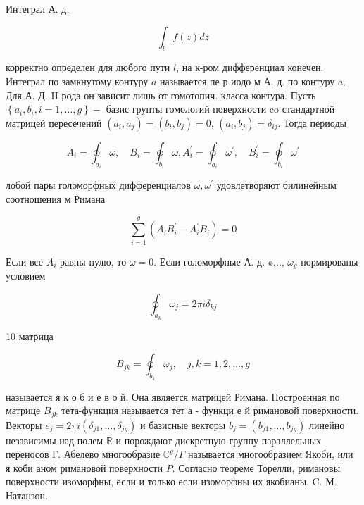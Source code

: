 \documentclass[10pt]{article}
\begin{document}
Интеграл А. д.



\[

\int_{l} f(z) d z

\]



корректно определен для любого пути $l$, на к-ром дифференциал конечен. Интеграл по замкнутому контуру $a$ называется пе р иодо м А. д. по контуру $a$. Для А. Д. II рода он зависит лишь от гомотопич. класса контура. Пусть $\left\{a_{i}, b_{i}, i=1, \ldots, g\right\}-$ базис групты гомологий поверхности co стандартной матрицей пересечений $\left(a_{i}, a_{j}\right)=\left(b_{i}, b_{j}\right)=0$, $\left(a_{i}, b_{j}\right)=\delta_{i j}$. Тогда периоды



\[

A_{i}=\oint_{a_{i}} \omega, \quad B_{i}=\oint_{b_{i}} \omega, A_{i}^{\prime}=\oint_{a_{i}} \omega^{\prime}, \quad B_{i}^{\prime}=\oint_{b_{i}} \omega^{\prime}

\]



лобой пары голоморфных дифференциалов $\omega, \omega^{\prime}$ удовлетворяют билинейным соотношения м Римана



\[

\sum_{i=1}^{g}\left(A_{i} B_{i}^{\prime}-A_{i}^{\prime} B_{i}\right)=0

\]



Если все $A_{i}$ равны нулю, то $\omega=0$. Если голоморфные А. д. ๑,.., $\omega_{g}$ нормированы условием



\[

\oint_{a_{k}} \omega_{j}=2 \pi i \delta_{k j}

\]



10 матрица



\[

B_{j k}=\oint_{b_{k}} \omega_{j}, \quad j, k=1,2, \ldots, g

\]



называется я к о б и е в о й. Она является матрицей Римана. Построенная по матрице $B_{j k}$ тета-функция называется тет а - функци е й римановой поверхности. Векторы $e_{j}=2 \pi i\left(\delta_{j 1}, \ldots, \delta_{j g}\right)$ и базисные векторы $b_{j}=\left(b_{j 1}, \ldots, b_{j g}\right)$ линейно независимы над полем $\mathbb{R}$ и порождают дискретную группу параллельных переносов Г. Абелево многообразие $\mathbb{C}^{g} / \Gamma$ называется многообразием Якоби, или я коби аном римановой поверхности $P$. Согласно теореме Торелли, римановы поверхности изоморфны, если и только если изоморфны их якобианы. C. М. Натанзон.
\end{document}
